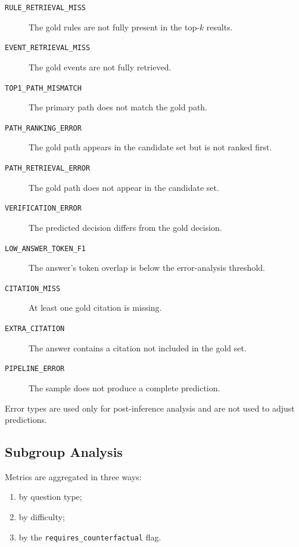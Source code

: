\begin{description}
    \item[\texttt{RULE\_RETRIEVAL\_MISS}]
    The gold rules are not fully present in the top-\(k\) results.

    \item[\texttt{EVENT\_RETRIEVAL\_MISS}]
    The gold events are not fully retrieved.

    \item[\texttt{TOP1\_PATH\_MISMATCH}]
    The primary path does not match the gold path.

    \item[\texttt{PATH\_RANKING\_ERROR}]
    The gold path appears in the candidate set but is not ranked first.

    \item[\texttt{PATH\_RETRIEVAL\_ERROR}]
    The gold path does not appear in the candidate set.

    \item[\texttt{VERIFICATION\_ERROR}]
    The predicted decision differs from the gold decision.

    \item[\texttt{LOW\_ANSWER\_TOKEN\_F1}]
    The answer's token overlap is below the error-analysis threshold.

    \item[\texttt{CITATION\_MISS}]
    At least one gold citation is missing.

    \item[\texttt{EXTRA\_CITATION}]
    The answer contains a citation not included in the gold set.

    \item[\texttt{PIPELINE\_ERROR}]
    The sample does not produce a complete prediction.
\end{description}

Error types are used only for post-inference analysis and are not used to
adjust predictions.

\subsection{Subgroup Analysis}

Metrics are aggregated in three ways:

\begin{enumerate}
    \item by question type;
    \item by difficulty;
    \item by the \texttt{requires\_counterfactual} flag.
\end{enumerate}

